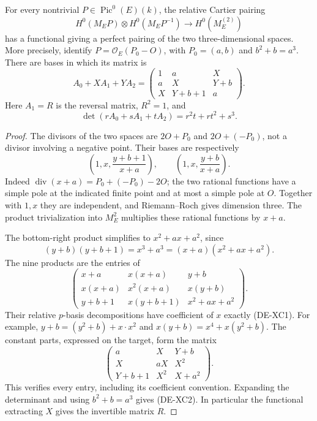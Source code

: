 \begin{lemma}
\label{lem:DE-SS-cross-elliptic}
For every nontrivial \(P\in\operatorname{Pic}^0(E)(k)\), the
relative Cartier pairing
\[
 H^0(M_E P)\otimes H^0(M_E P^{-1})
       \longrightarrow H^0(M_E^{(2)})
\]
has a functional giving a perfect pairing of the two
three-dimensional spaces. More precisely, identify
\(P=\mathcal O_E(P_0-O)\), with \(P_0=(a,b)\) and
\(b^2+b=a^3\). There are bases in which its matrix is
\[
 A_0+X A_1+Y A_2=
 \begin{pmatrix}
 1&a&X\\ a&X&Y+b\\ X&Y+b+1&a
 \end{pmatrix}.                                      \tag{DE-XC1}
\]
Here \(A_1=R\) is the reversal matrix, \(R^2=1\), and
\[
 \det(rA_0+sA_1+tA_2)=r^2t+rt^2+s^3.                 \tag{DE-XC2}
\]
\end{lemma}
\begin{proof}
The divisors of the two spaces are \(2O+P_0\) and
\(2O+(-P_0)\), not a divisor involving a negative point.
Their bases are respectively
\[
 \left(1,x,\frac{y+b+1}{x+a}\right),\qquad
 \left(1,x,\frac{y+b}{x+a}\right).
\]
Indeed \(\operatorname{div}(x+a)=P_0+(-P_0)-2O\);
the two rational functions have a simple pole at the indicated
finite point and at most a simple pole at \(O\). Together with
\(1,x\) they are independent, and Riemann--Roch gives dimension
three. The product trivialization into \(M_E^2\) multiplies
these rational functions by \(x+a\).

The bottom-right product simplifies to \(x^2+ax+a^2\), since
\[
 (y+b)(y+b+1)=x^3+a^3=(x+a)(x^2+ax+a^2).
\]
The nine products are the entries of
\[
 \begin{pmatrix}
 x+a&x(x+a)&y+b\\
 x(x+a)&x^2(x+a)&x(y+b)\\
 y+b+1&x(y+b+1)&x^2+ax+a^2
 \end{pmatrix}.
\]
Their relative \(p\)-basis decompositions have coefficient
of \(x\) exactly (DE-XC1). For example,
\(y+b=(y^2+b)+x\cdot x^2\) and
\(x(y+b)=x^4+x(y^2+b)\). The constant parts, expressed on
the target, form the matrix
\[
 \begin{pmatrix}
 a&X&Y+b\\ X&aX&X^2\\ Y+b+1&X^2&X+a^2
 \end{pmatrix}.
\]
This verifies every entry, including its coefficient convention.
Expanding the determinant and using \(b^2+b=a^3\) gives
(DE-XC2). In particular the functional extracting \(X\)
gives the invertible matrix \(R\).
\end{proof}

